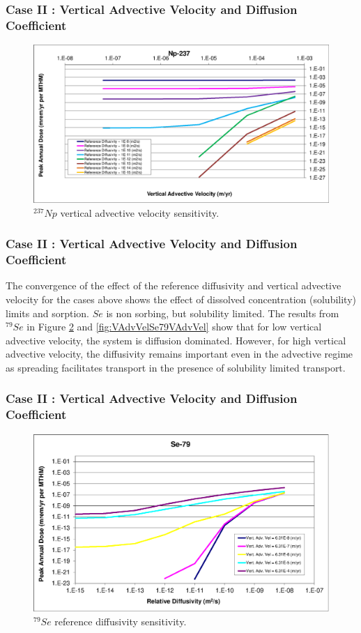 \begin{frame}[c]
\begin{frame}[c]
  \frametitle{Case II : Vertical Advective Velocity and Diffusion Coefficient}
\begin{figure}[ht!]
\centering
\includegraphics[width=\linewidth]{AdvVelAndDiffCoeffEBSFail/Np-237-VAdvVel.eps}
\caption{$^{237}Np$ vertical advective velocity sensitivity.}
\label{fig:VAdvVelNp237VAdvVel}
\end{figure}
\end{frame}
  

\begin{frame}[c]
  \frametitle{Case II : Vertical Advective Velocity and Diffusion Coefficient}
The convergence of the effect of the reference diffusivity and vertical 
advective velocity for the cases above shows the effect of dissolved 
concentration (solubility) limits and sorption. $Se$ is non sorbing, but 
solubility limited.  The results from $^{79}Se$ in Figure \ref{fig:VAdvVelSe79} 
and \ref{fig:VAdvVelSe79VAdvVel} show that for low vertical advective velocity, 
the system is diffusion dominated.  However, for high vertical advective 
velocity, the diffusivity remains important even in the advective regime as 
spreading facilitates transport in the presence of solubility limited transport. 
\end{frame}

\begin{frame}[c]
  \frametitle{Case II : Vertical Advective Velocity and Diffusion Coefficient}
\begin{figure}[htp!]
\centering
\includegraphics[width=\linewidth]{AdvVelAndDiffCoeffEBSFail/Se-79.eps}
\caption{$^{79}Se$ reference diffusivity sensitivity.}
\label{fig:VAdvVelSe79}
\end{figure}
\end{frame}


\end{frame}
